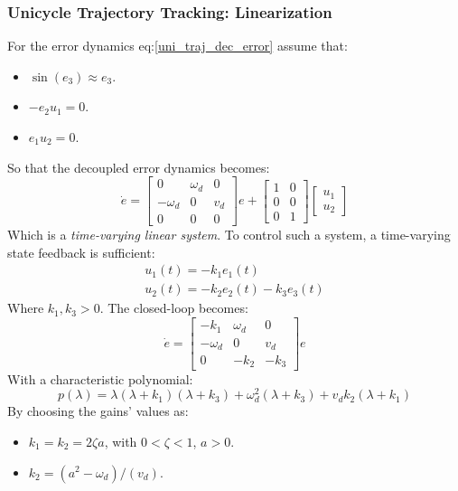 \subsubsection{Unicycle Trajectory Tracking: Linearization}
For the error dynamics eq:\ref{uni_traj_dec_error} assume that:
\begin{itemize}
    \item $\sin(e_{3})\approx e_{3}$.
    \item $-e_{2}u_{1}=0$.
    \item $e_{1}u_{2}=0$.
\end{itemize}
So that the decoupled error dynamics becomes:
\begin{equation*}
    \dot{e}=
    \begin{bmatrix}
        0 & \omega_d & 0 \\
        -\omega_d & 0 & v_d \\
        0 & 0 & 0
    \end{bmatrix} e +
    \begin{bmatrix}
        1 & 0 \\
        0 & 0 \\
        0 & 1
    \end{bmatrix}
    \begin{bmatrix}
        u_1 \\ u_2
    \end{bmatrix}
\end{equation*}
Which is a \textit{time-varying linear system}. To control such a system, a time-varying state feedback is sufficient:
\begin{gather}\label{uni_lin_feedback}
    u_1(t)=-k_1e_1(t) \\
    u_2(t)=-k_2e_2(t)-k_3e_3(t)
\end{gather}
Where $k_1,k_3>0$. The closed-loop becomes:
\begin{equation*}
    \dot{e}=
    \begin{bmatrix}
        -k_1 & \omega_d & 0 \\
        -\omega_d & 0 & v_d \\
        0 & -k_2 & -k_3
    \end{bmatrix} e
\end{equation*}
With a characteristic polynomial:
\[p(\lambda)=\lambda(\lambda+k_1)(\lambda+k_3)+\omega_d^2(\lambda+k_3)+v_dk_2(\lambda+k_1)\]
By choosing the gains' values as:
\begin{itemize}
    \item $k_1=k_2=2\zeta a$, with $0<\zeta<1$, $a>0$.
    \item $k_2=(a^2-\omega_d)/(v_d)$.
\end{itemize}
